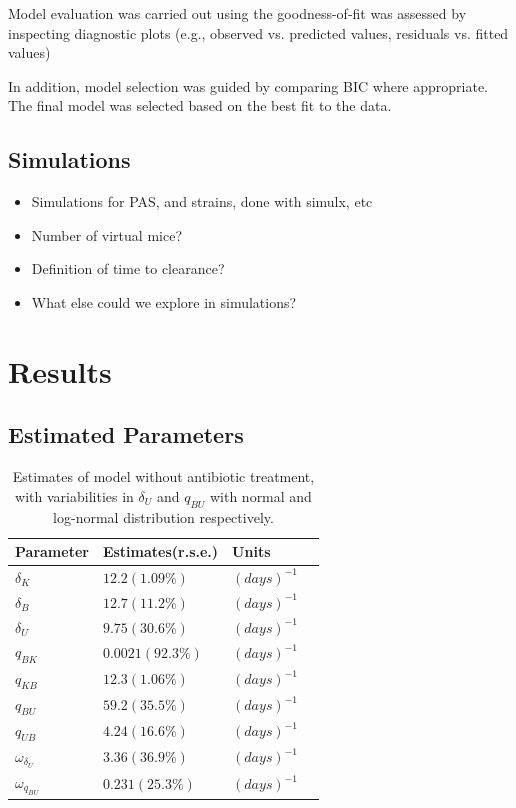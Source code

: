 \documentclass{article}
\begin{document}
Model evaluation was carried out using the goodness-of-fit was assessed by inspecting diagnostic plots (e.g., observed vs. predicted values, residuals vs. fitted values)

In addition, model selection was guided by comparing BIC where appropriate. The final model was selected based on the best fit to the data. 


\subsection{Simulations}
\begin{itemize}
	\item Simulations for PAS, and strains, done with simulx, etc
	\item Number of virtual mice?
	\item Definition of time to clearance?
	\item What else could we explore in simulations?
\end{itemize}



\section{Results}

\subsection{Estimated Parameters}

	\begin{table}
	\begin{tabular}{|l|l|l|l|}
		\hline
		Parameter & Estimates(r.s.e.) & Units\\ \hline
		$\delta_{K}$ & $12.2(1.09\%)$ & $(days)^{-1}$\\
		$\delta_{B}$ & $12.7(11.2\%)$ & $(days)^{-1}$\\
		$\delta_{U}$ & $9.75(30.6\%)$ & $(days)^{-1}$\\
		$q_{BK}$ & $0.0021(92.3\%)$ & $(days)^{-1}$\\
		$q_{KB}$ & $12.3(1.06\%)$ & $(days)^{-1}$\\
		$q_{BU}$ & $59.2(35.5\%)$ & $(days)^{-1}$\\
		$q_{UB}$ & $4.24(16.6\%)$ & $(days)^{-1}$\\
		$\omega_{\delta_{U}}$ & $3.36(36.9\%)$ & $(days)^{-1}$\\
		$\omega_{q_{BU}}$ & $0.231(25.3\%)$ & $(days)^{-1}$\\
		\hline
	\end{tabular}
	\caption{Estimates of model without antibiotic treatment, with variabilities in $\delta_U$ and $q_{BU}$ with normal and log-normal distribution respectively.}
\end{table}
\end{document}
